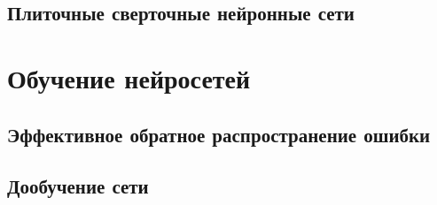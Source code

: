 \documentclass[a4paper,14pt]{extarticle} %
\begin{document}
\subsection{Плиточные сверточные нейронные сети}
\hspace{\parindent}

\section{Обучение нейросетей}
\hspace{\parindent}

\subsection{Эффективное обратное распространение ошибки}
\hspace{\parindent}

\subsection{Дообучение сети}
\hspace{\parindent}

\newpage
\begin{flushleft}
\end{flushleft}
\end{document}
